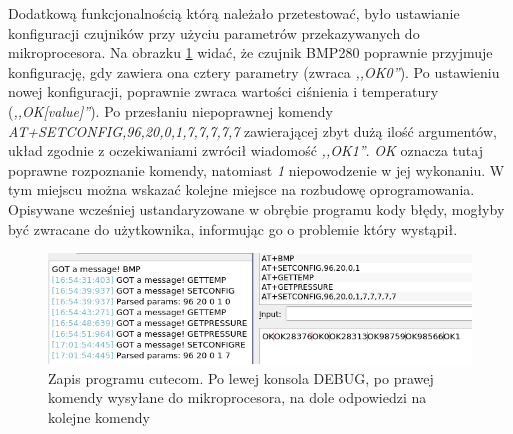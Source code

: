 Dodatkową funkcjonalnością którą należało przetestować, było ustawianie konfiguracji czujników przy użyciu parametrów przekazywanych do mikroprocesora. Na obrazku \ref{img:args} widać, że czujnik BMP280 poprawnie przyjmuje konfigurację, gdy zawiera ona cztery parametry (zwraca \textit{,,OK0''}). Po ustawieniu nowej konfiguracji, poprawnie zwraca wartości ciśnienia i temperatury (\textit{,,OK[value]''}). Po przesłaniu niepoprawnej komendy \textit{AT+SETCONFIG,96,20,0,1,7,7,7,7,7} zawierającej zbyt dużą ilość argumentów, układ zgodnie z oczekiwaniami zwrócił wiadomość \textit{,,OK1''}. \textit{OK} oznacza tutaj poprawne rozpoznanie komendy, natomiast \textit{1} niepowodzenie w jej wykonaniu. W tym miejscu można wskazać kolejne miejsce na rozbudowę oprogramowania. Opisywane wcześniej ustandaryzowane w obrębie programu kody błędy, mogłyby być zwracane do użytkownika, informując go o problemie który wystąpił.

\begin{figure}[H]
    \centering
    \includegraphics[width=\textwidth, height=\textheight, keepaspectratio]{Graphics/args.png}
    \caption{Zapis programu cutecom. Po lewej konsola DEBUG, po prawej komendy wysyłane do mikroprocesora, na dole odpowiedzi na kolejne komendy}
    \label{img:args}
\end{figure}